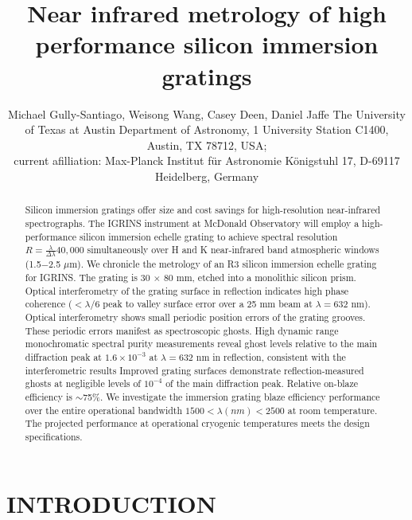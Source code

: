 \documentclass[]{spie}
\title{Near infrared metrology of high performance silicon immersion gratings}
\author{Michael Gully-Santiago\supit{a}, Weisong Wang\supit{a}, Casey Deen\supit{a,b}, Daniel Jaffe\supit{a}
\skiplinehalf
\supit{a}The University of Texas at Austin Department of Astronomy, 1 University Station C1400, Austin, TX 78712, USA; \\
\supit{b} current afilliation: Max-Planck Institut f\"{u}r Astronomie K\"{o}nigstuhl 17, D-69117 Heidelberg, Germany}
\begin{document}
 
  \maketitle 

\begin{abstract}
Silicon immersion gratings offer size and cost savings for high-resolution near-infrared spectrographs.  The IGRINS instrument at McDonald Observatory will employ a high-performance silicon immersion echelle grating to achieve spectral resolution $R=\frac{\lambda}{\Delta \lambda}40,000$ simultaneously over H and K near-infrared band atmospheric windows (1.5$-$2.5 $\mu$m).  We chronicle the metrology of an R3 silicon immersion echelle grating for IGRINS.  The grating is 30 $\times$ 80 mm, etched into a monolithic silicon prism.  Optical interferometry of the grating surface in reflection indicates high phase coherence ($< \lambda/6$ peak to valley surface error over a 25 mm beam at $\lambda=632$ nm).  Optical interferometry shows small periodic position errors of the grating grooves.  These periodic errors manifest as spectroscopic ghosts.  High dynamic range monochromatic spectral purity measurements reveal ghost levels relative to the main diffraction peak at $1.6 \times 10^{-3}$ at $\lambda = 632$ nm in reflection, consistent with the interferometric results  Improved grating surfaces demonstrate reflection-measured ghosts at negligible levels of $10^{-4}$ of the main diffraction peak.  Relative on-blaze efficiency is $\sim$75\%.  We investigate the immersion grating blaze efficiency performance over the entire operational bandwidth $1500 < \lambda(nm) < 2500$ at room temperature.  The projected performance at operational cryogenic temperatures meets the design specifications.
\end{abstract}



\section{INTRODUCTION}
\label{sec:intro} 
\end{document}
